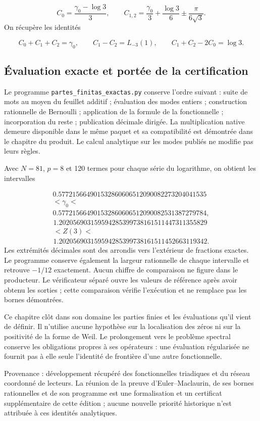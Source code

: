 \[
C_0=\frac{\gamma_0-\log3}{3},\qquad
C_{1,2}=\frac{\gamma_0}{3}+\frac{\log3}{6}
\mathbin{\pm}\frac{\pi}{6\sqrt3}.
\]
On récupère les identités

\[
C_0+C_1+C_2=\gamma_0,\qquad
C_1-C_2=L_{-3}(1),\qquad C_1+C_2-2C_0=\log3.
\]
\clearpage
\subsection{Évaluation exacte et portée de la certification}
Le programme \texttt{partes\_\allowbreak{}finitas\_\allowbreak{}exactas.\allowbreak{}py} conserve l’ordre suivant : suite de mots au moyen du feuillet additif ; évaluation des modes entiers ; construction rationnelle de Bernoulli ; application de la formule de la fonctionnelle ; incorporation du reste ; publication décimale dirigée. La multiplication native demeure disponible dans le même paquet et sa compatibilité est démontrée dans le chapitre du produit. Le calcul analytique sur les modes publiés ne modifie pas leurs règles.

Avec \(N=81\), \(p=8\) et 120 termes pour chaque série du logarithme, on obtient les intervalles

\[
\begin{gathered}
0.577215664901532860606512090082273204041535\\
<\gamma_0<\\
0.577215664901532860606512090082531387279784,
\end{gathered}
\]
\[
\begin{gathered}
1.202056903159594285399738161511447311355829\\
<Z(3)<\\
1.202056903159594285399738161511452663119342.
\end{gathered}
\]
Les extrémités décimales sont des arrondis vers l’extérieur de fractions exactes. Le programme conserve également la largeur rationnelle de chaque intervalle et retrouve \(-1/12\) exactement. Aucun chiffre de comparaison ne figure dans le producteur. Le vérificateur séparé ouvre les valeurs de référence après avoir obtenu les sorties ; cette comparaison vérifie l’exécution et ne remplace pas les bornes démontrées.

Ce chapitre clôt dans son domaine les parties finies et les évaluations qu'il vient de définir. Il n'utilise aucune hypothèse sur la localisation des zéros ni sur la positivité de la forme de Weil. Le prolongement vers le problème spectral conserve les obligations propres à ses opérateurs : une évaluation régularisée ne fournit pas à elle seule l'identité de frontière d'une autre fonctionnelle.

Provenance : développement récupéré des fonctionnelles triadiques et du réseau coordonné de lecteurs. La réunion de la preuve d’Euler–Maclaurin, de ses bornes rationnelles et de son programme est une formalisation et un certificat supplémentaire de cette édition ; aucune nouvelle priorité historique n’est attribuée à ces identités analytiques.
